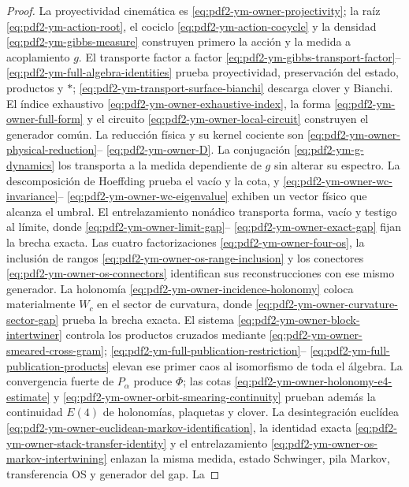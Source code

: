 \begin{proof}
La proyectividad cinemática es \eqref{eq:pdf2-ym-owner-projectivity}; la raíz
\eqref{eq:pdf2-ym-action-root}, el cociclo
\eqref{eq:pdf2-ym-action-cocycle} y la densidad
\eqref{eq:pdf2-ym-gibbs-measure} construyen primero la acción y la medida a
acoplamiento $g$. El transporte factor a factor
\eqref{eq:pdf2-ym-gibbs-transport-factor}--
\eqref{eq:pdf2-ym-full-algebra-identities} prueba proyectividad, preservación del
estado, productos y $*$; 
\eqref{eq:pdf2-ym-transport-surface-bianchi} descarga clover y Bianchi. El índice exhaustivo
\eqref{eq:pdf2-ym-owner-exhaustive-index}, la forma
\eqref{eq:pdf2-ym-owner-full-form} y el circuito
\eqref{eq:pdf2-ym-owner-local-circuit} construyen el generador común. La reducción
física y su kernel cociente son
\eqref{eq:pdf2-ym-owner-physical-reduction}--
\eqref{eq:pdf2-ym-owner-D}. La conjugación
\eqref{eq:pdf2-ym-g-dynamics} los transporta a la medida dependiente de $g$ sin
alterar su espectro. La descomposición de Hoeffding prueba el vacío y la cota, y
\eqref{eq:pdf2-ym-owner-wc-invariance}--
\eqref{eq:pdf2-ym-owner-wc-eigenvalue} exhiben un vector físico que alcanza el
umbral. El entrelazamiento nonádico transporta forma, vacío y testigo al límite, donde
\eqref{eq:pdf2-ym-owner-limit-gap}--
\eqref{eq:pdf2-ym-owner-exact-gap} fijan la brecha exacta. Las cuatro
factorizaciones \eqref{eq:pdf2-ym-owner-four-os}, la inclusión de rangos
\eqref{eq:pdf2-ym-owner-os-range-inclusion} y los conectores
\eqref{eq:pdf2-ym-owner-os-connectors} identifican sus reconstrucciones con ese
mismo generador. La holonomía
\eqref{eq:pdf2-ym-owner-incidence-holonomy} coloca materialmente $W_c$ en el sector
de curvatura, donde \eqref{eq:pdf2-ym-owner-curvature-sector-gap} prueba la brecha
exacta. El sistema \eqref{eq:pdf2-ym-owner-block-intertwiner} controla los productos
cruzados mediante \eqref{eq:pdf2-ym-owner-smeared-cross-gram};
\eqref{eq:pdf2-ym-full-publication-restriction}--
\eqref{eq:pdf2-ym-full-publication-products} elevan ese primer caos al isomorfismo
de toda el álgebra. La convergencia fuerte de $P_\alpha$ produce $\Phi$; las cotas
\eqref{eq:pdf2-ym-owner-holonomy-e4-estimate} y
\eqref{eq:pdf2-ym-owner-orbit-smearing-continuity} prueban además la continuidad
$E(4)$ de holonomías, plaquetas y clover. La desintegración euclídea
\eqref{eq:pdf2-ym-owner-euclidean-markov-identification}, la identidad exacta
\eqref{eq:pdf2-ym-owner-stack-transfer-identity} y el entrelazamiento
\eqref{eq:pdf2-ym-owner-os-markov-intertwining} enlazan la misma medida,
estado Schwinger, pila Markov, transferencia OS y generador del gap. La

\end{proof}
